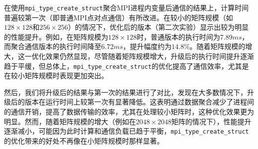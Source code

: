 \documentclass[a4paper, utf8]{ctexart}
\begin{document}
	在使用\verb|mpi_type_create_struct|聚合MPI进程内变量后通信的结果上，计算时间普遍较第一次（即普通MPI点对点通信）有所改进。在较小的矩阵规模（如$128\times128$和$256\times256$）的情况下，优化后的版本（第二次实验）显示出较为明显的性能提升。例如，在矩阵规模为$128\times128$时，普通版本的执行时间为$7.89ms$，而聚合通信版本的执行时间降至$6.72ms$，提升幅度约为$14.8\%$。随着矩阵规模的增大，这一优化效果仍然显现，尽管随着矩阵规模增大，升级后的执行时间提升逐渐趋于平缓，但总体上，\verb|mpi_type_create_struct|的优化提高了通信效率，尤其是在较小矩阵规模时表现更加突出。
	
	然后，我们将升级后的结果与第一次的结果进行了对比，发现在大多数情况下，升级后的版本在运行时间上较第一次有显著降低。这表明通过数据聚合减少了进程间的通信开销，提高了数据传输的效率，尤其在处理较小矩阵时，这种优化效果更为明显。然而，随着矩阵规模的增大（例如在$2048\times2048$矩阵的情况下），性能提升逐渐减小，可能因为此时计算和通信负载已趋于平衡，\verb|mpi_type_create_struct|的优化带来的好处不再像在小矩阵规模时那样显著。
	
\end{document}
